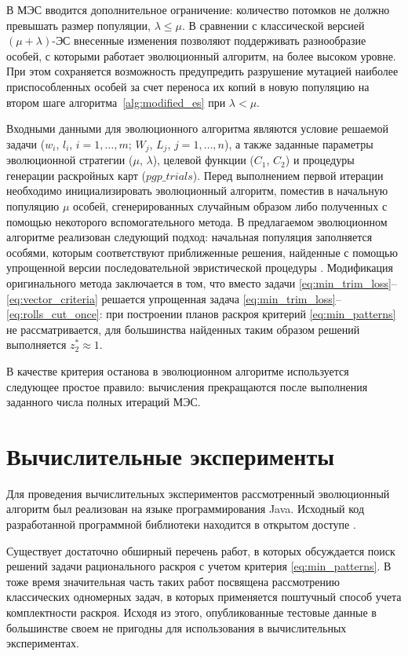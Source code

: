 \documentclass[12pt]{article}
\begin{document}
В МЭС вводится дополнительное 
ограничение: количество потомков не должно превышать размер популяции, 
$\lambda \leq \mu$. В сравнении с классической версией $(\mu + \lambda)$-ЭС 
внесенные изменения позволяют поддерживать разнообразие особей, с которыми 
работает эволюционный алгоритм, на более высоком уровне. При этом сохраняется 
возможность предупредить разрушение мутацией наиболее приспособленных особей 
за счет переноса их копий в новую популяцию на втором шаге 
алгоритма~\ref{alg:modified_es}
при $\lambda<\mu$.

Входными данными для эволюционного алгоритма являются условие решаемой задачи 
($w_i$, $l_i$, $i=1,\ldots,m$; $W_j$, $L_j$, $j=1,\ldots,n$), а также заданные 
параметры эволюционной стратегии ($\mu$, $\lambda$), целевой функции 
($C_1$, $C_2$) и процедуры генерации раскройных карт ($pgp\_trials$). Перед 
выполнением первой итерации необходимо инициализировать эволюционный алгоритм, 
поместив в начальную популяцию $\mu$ особей, сгенерированных случайным образом 
либо полученных с помощью некоторого вспомогательного метода. В предлагаемом 
эволюционном алгоритме реализован следующий подход: начальная популяция 
заполняется особями, которым соответствуют приближенные решения, найденные 
с помощью упрощенной версии последовательной эвристической процедуры 
\cite{haessler88}. 
Модификация оригинального метода 
\cite{haessler88} 
заключается в том, что вместо задачи 
\eqref{eq:min_trim_loss}--\eqref{eq:vector_criteria} 
решается упрощенная задача 
\eqref{eq:min_trim_loss}--\eqref{eq:rolls_cut_once}: 
при построении планов раскроя 
критерий 
\eqref{eq:min_patterns} 
не рассматривается, для большинства найденных таким образом 
решений выполняется $z_2^* \approx 1$.

В качестве критерия останова в эволюционном алгоритме используется следующее 
простое правило: вычисления прекращаются после выполнения заданного числа 
полных итераций МЭС.


\section{Вычислительные эксперименты}

Для проведения вычислительных экспериментов рассмотренный эволюционный 
алгоритм был реализован на языке программирования Java. Исходный код 
разработанной программной библиотеки находится в открытом доступе
\cite{github}.

Существует достаточно обширный перечень работ, в которых обсуждается поиск 
решений задачи рационального раскроя с учетом критерия 
\eqref{eq:min_patterns}. 
В тоже время 
значительная часть таких работ посвящена рассмотрению классических одномерных 
задач, в которых применяется поштучный способ учета комплектности раскроя. 
Исходя из этого, опубликованные тестовые данные в большинстве своем не 
пригодны для использования в вычислительных экспериментах.
\end{document}
